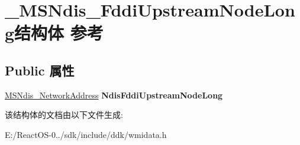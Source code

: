 \hypertarget{struct___m_s_ndis___fddi_upstream_node_long}{}\section{\+\_\+\+M\+S\+Ndis\+\_\+\+Fddi\+Upstream\+Node\+Long结构体 参考}
\label{struct___m_s_ndis___fddi_upstream_node_long}
\subsection*{Public 属性}
\begin{DoxyCompactItemize}
\item 
\mbox{\label{struct___m_s_ndis___fddi_upstream_node_long_a0407dd3b74c4b4f426e687ecb8ecc5e7}} 
\hyperlink{struct___m_s_ndis___network_address}{M\+S\+Ndis\+\_\+\+Network\+Address} {\bfseries Ndis\+Fddi\+Upstream\+Node\+Long}
\end{DoxyCompactItemize}


该结构体的文档由以下文件生成\+:\begin{DoxyCompactItemize}
\item 
E\+:/\+React\+O\+S-\/0../sdk/include/ddk/wmidata.\+h\end{DoxyCompactItemize}
